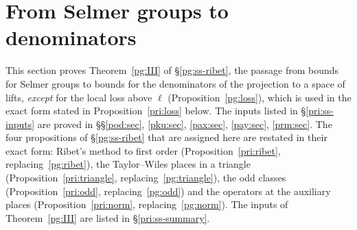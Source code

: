 \documentclass[10pt]{amsart}
\theoremstyle{definition}
\theoremstyle{remark}
\newcommand{\Z}{\mathbb Z}
\newcommand{\Q}{\mathbb Q}
\begin{document}
\providecommand{\auO}{\mathcal O}
\providecommand{\auQlb}{\overline{\Q}_\ell}
\providecommand{\auGL}{\mathrm{GL}}
\providecommand{\auF}{\mathbb F}
\providecommand{\auU}{\mathrm U}
\providecommand{\auNm}{\operatorname{Nm}}
\providecommand{\auf}[1]{\texttt{#1}}
\providecommand{\panot}[1]{\par\smallskip{\raggedright\noindent\textbf{[Not proved here:} #1\textbf{]}\par}\smallskip}
\providecommand{\pgZb}{\overline{\Z}_\ell}
\providecommand{\pgv}{v}
\providecommand{\pgNch}{N_{\mathrm{ch}}}
\providecommand{\pgcodd}{c_{\mathrm{odd}}}
\providecommand{\pgloc}{\mathrm{loc}}
\providecommand{\pgG}{G_E}
\providecommand{\pgSel}{\operatorname{Sel}}
\providecommand{\pglen}{\operatorname{len}}
\providecommand{\pgtr}{\operatorname{tr}}
\providecommand{\pgFrob}{\operatorname{Frob}}
\providecommand{\pgpr}{\operatorname{pr}}
\providecommand{\pgcyc}{\varepsilon_\ell}
\providecommand{\pgS}{S_{\mathrm{bad}}}
\providecommand{\priFitt}{\operatorname{Fitt}}
\providecommand{\prilen}{\operatorname{len}}
\providecommand{\prirl}{\operatorname{rl}}
\providecommand{\prival}{\operatorname{val}}
\providecommand{\priAug}{\mathfrak I}
\providecommand{\priT}{\mathbb T}
\providecommand{\priX}{\mathcal X}
\providecommand{\priJ}{\mathcal J}
\providecommand{\prid}{\mathcal D}
\providecommand{\priN}{\mathcal N}
\providecommand{\priZ}{\mathcal Z}
\providecommand{\prics}{\mathrm{cs}}
\providecommand{\prity}{\mathrm{ty}}

\section{From Selmer groups to denominators}\label{pri:sec}

This section proves Theorem~\ref{pg:III} of \S\ref{pg:ss-ribet}, the passage from bounds for Selmer
groups to bounds for the denominators of the projection to a space of lifts, \emph{except} for the
local loss above $\ell$ (Proposition~\ref{pg:loss}), which is used in the exact form stated in
Proposition~\ref{pri:loss} below. The inputs listed in \S\ref{pri:ss-inputs} are proved in
\S\S\ref{pod:sec}, \ref{pku:sec}, \ref{pax:sec}, \ref{pay:sec}, \ref{prm:sec}. The
four propositions of \S\ref{pg:ss-ribet} that are assigned here are restated in their exact form:
Ribet's method to first order (Proposition~\ref{pri:ribet}, replacing~\ref{pg:ribet}), the
Taylor--Wiles places in a triangle (Proposition~\ref{pri:triangle}, replacing~\ref{pg:triangle}),
the odd classes (Proposition~\ref{pri:odd}, replacing~\ref{pg:odd}) and the operators at the
auxiliary places (Proposition~\ref{pri:norm}, replacing~\ref{pg:norm}). The inputs of
Theorem~\ref{pg:III} are listed in \S\ref{pri:ss-summary}.
\end{document}
